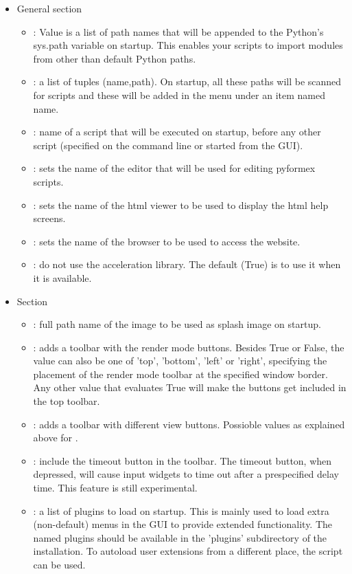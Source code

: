 \begin{itemize}
\item General section
  \begin{itemize}
  \item {}: Value is a list of path names that will be appended to the Python's sys.path variable on startup. This enables your scripts to import modules from other than default Python paths.
  \item {}: a list of tuples (name,path). On startup, all these paths will be scanned for \pyf scripts and these will be added in the \pyf menu under an item named name.
  \item {}: name of a \pyf script that will be executed on startup, before any other script (specified on the command line or started from the GUI).
  \item {}: sets the name of the editor that will be used for editing pyformex scripts.
  \item {}: sets the name of the html viewer to be used to display the html help screens.
  \item {}: sets the name of the browser to be used to access the \pyf website.
  \item {}: do not use the \pyf acceleration library. The default (True) is to use it when it is available.
  \end{itemize}

\item Section \Code{[gui]}
  \begin{itemize}
  \item {}: full path name of the image to be used as splash image on startup.
  \item {}: adds a toolbar with the render mode buttons. Besides True or False, the value can also be one of 'top', 'bottom', 'left' or 'right', specifying the placement of the render mode toolbar at the specified window border. Any other value that evaluates True will make the buttons get included in the top toolbar.
  \item {}: adds a toolbar with different view buttons. Possioble values as explained above for .
  \item {}: include the timeout button in the toolbar. The timeout button, when depressed, will cause input widgets to time out after a prespecified delay time. This feature is still experimental.
  \item {}: a list of plugins to load on startup. This is mainly used to load extra (non-default) menus in the GUI to provide extended functionality. The named plugins should be available in the 'plugins' subdirectory of the \pyf installation. To autoload user extensions from a different place, the  script can be used.



\end{itemize}
\end{itemize}
